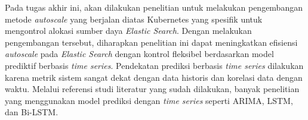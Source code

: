 Pada tugas akhir ini, akan dilakukan penelitian untuk melakukan pengembangan metode \textit{autoscale} yang berjalan diatas Kubernetes yang spesifik untuk mengontrol alokasi sumber daya \textit{Elastic Search}. Dengan melakukan pengembangan tersebut, diharapkan penelitian ini dapat meningkatkan efisiensi \textit{autoscale} pada \textit{Elastic Search} dengan kontrol fleksibel berdasarkan model prediktif berbasis \textit{time series}. Pendekatan prediksi berbasis \textit{time series} dilakukan karena metrik sistem sangat dekat dengan data historis dan korelasi data dengan waktu. Melalui referensi studi literatur yang sudah dilakukan, banyak penelitian yang menggunakan model prediksi dengan \textit{time series} seperti ARIMA, LSTM, dan Bi-LSTM.

